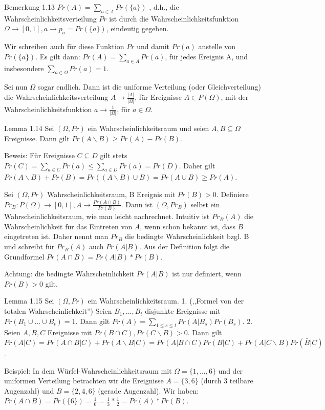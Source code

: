 \documentclass[a4paper]{article}
\begin{document}
\begin{multicols}{3}
    Bemerkung 1.13 $Pr(A) =\sum_{a\in A} Pr(\{a\})$ , d.h., die Wahrscheinlichkeitsverteilung $Pr$ ist durch die Wahrscheinlichkeitsfunktion $\Omega\rightarrow[0,1],a \rightarrow p_a= Pr(\{a\})$, eindeutig gegeben.

    Wir schreiben auch für diese Funktion $Pr$ und damit $Pr(a)$ anstelle von $Pr(\{a\})$. Es gilt dann: $Pr(A)=\sum_{a\in A} Pr(a)$, für jedes Ereignis A, und insbesondere $\sum_{a\in\Omega}Pr(a) = 1$.

    Sei nun $\Omega$ sogar endlich. Dann ist die uniforme Verteilung (oder Gleichverteilung) die  Wahrscheinlichkeitsverteilung $A\rightarrow\frac{|A|}{|\Omega|}$, für Ereignisse $A\in P(\Omega)$, mit der Wahrscheinlichkeitsfunktion $a\rightarrow \frac{1}{|\Omega|}$, für $a\in\Omega$.

    Lemma 1.14 Sei $(\Omega,Pr)$ ein Wahrscheinlichkeitsraum und seien $A,B\subseteq\Omega$ Ereignisse. Dann gilt $Pr(A\backslash B)\geq Pr(A)-Pr(B)$.

    Beweis: Für Ereignisse $C\subseteq D$ gilt stets $Pr(C)=\sum_{a\in C} Pr(a)\leq \sum_{a\in D} Pr(a) = Pr(D)$.
    Daher gilt $Pr(A\backslash B) + Pr(B) = Pr((A\backslash B)\cup B) = Pr(A\cup B)\geq Pr(A)$.

    Sei $(\Omega,Pr)$ Wahrscheinlichkeitsraum, B Ereignis mit $Pr(B)> 0$. Definiere $Pr_B:P(\Omega)\rightarrow[0,1],A \rightarrow\frac{Pr(A\cap B)}{Pr(B)}$.
    Dann ist $(\Omega,Pr_B)$ selbst ein Wahrscheinlichkeitsraum, wie man leicht nachrechnet. Intuitiv ist $Pr_B(A)$ die Wahrscheinlichkeit für das Eintreten von $A$, wenn schon bekannt ist, dass $B$ eingetreten ist. Daher nennt man $Pr_B$ die bedingte Wahrscheinlichkeit bzgl. B und schreibt für $Pr_B(A)$ auch $Pr(A|B)$. Aus der Definition folgt die Grundformel $Pr(A\cap B) = Pr(A|B)*Pr(B)$.

    Achtung: die bedingte Wahrscheinlichkeit $Pr(A|B)$ ist nur definiert, wenn $Pr(B)> 0$ gilt.

    Lemma 1.15 Sei $(\Omega,Pr)$ ein Wahrscheinlichkeitsraum.
    1. (,,Formel von der totalen Wahrscheinlichkeit'') Seien $B_1,...,B_t$ disjunkte Ereignisse mit $Pr(B_1\cup...\cup B_t)=1$. Dann gilt $Pr(A)=\sum_{1\leq s\leq t} Pr(A|B_s)Pr(B_s)$.
    2. Seien $A,B,C$ Ereignisse mit $Pr(B\cap C),Pr(C\backslash B)>0$. Dann gilt $Pr(A|C)=Pr(A\cap B | C) + Pr(A\backslash B|C)= Pr(A|B\cap C)Pr(B|C) + Pr(A|C\backslash B)Pr(\bar{B}|C)$.

    Beispiel: In dem Würfel-Wahrscheinlichkeitsraum mit $\Omega=\{1,...,6\}$ und der uniformen Verteilung betrachten wir die Ereignisse $A=\{3,6\}$ (durch 3 teilbare Augenzahl) und $B=\{2,4,6\}$ (gerade Augenzahl). Wir haben: $Pr(A\cap B) = Pr(\{6\})=\frac{1}{6}=\frac{1}{3}*\frac{1}{2}=Pr(A)*Pr(B)$.


\end{multicols}
\end{document}
